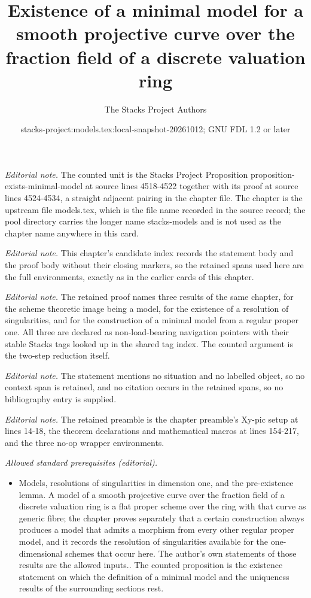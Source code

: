 \documentclass[10pt,a4paper]{amsart}
\title{Existence of a minimal model for a smooth projective curve over the fraction field of a discrete valuation ring}
\author{The Stacks Project Authors}
\date{stacks-project:models.tex:local-snapshot-20261012; GNU FDL 1.2 or later}
\theoremstyle{plain}
\theoremstyle{definition}
\theoremstyle{remark}
\numberwithin{equation}{subsection}
\begin{document}
\maketitle
\noindent\textit{Editorial note.} The counted unit is the Stacks Project Proposition proposition-exists-minimal-model at source lines 4518-4522 together with its proof at source lines 4524-4534, a straight adjacent pairing in the chapter file. The chapter is the upstream file models.tex, which is the file name recorded in the source record; the pool directory carries the longer name stacks-models and is not used as the chapter name anywhere in this card.\par\medskip
\noindent\textit{Editorial note.} This chapter's candidate index records the statement body and the proof body without their closing markers, so the retained spans used here are the full environments, exactly as in the earlier cards of this chapter.\par\medskip
\noindent\textit{Editorial note.} The retained proof names three results of the same chapter, for the scheme theoretic image being a model, for the existence of a resolution of singularities, and for the construction of a minimal model from a regular proper one. All three are declared as non-load-bearing navigation pointers with their stable Stacks tags looked up in the shared tag index. The counted argument is the two-step reduction itself.\par\medskip
\noindent\textit{Editorial note.} The statement mentions no situation and no labelled object, so no context span is retained, and no citation occurs in the retained spans, so no bibliography entry is supplied.\par\medskip
\noindent\textit{Editorial note.} The retained preamble is the chapter preamble's Xy-pic setup at lines 14-18, the theorem declarations and mathematical macros at lines 154-217, and the three no-op wrapper environments.\par\medskip
\noindent\textit{Allowed standard prerequisites (editorial).}\begin{itemize}
\item Models, resolutions of singularities in dimension one, and the pre-existence lemma. A model of a smooth projective curve over the fraction field of a discrete valuation ring is a flat proper scheme over the ring with that curve as generic fibre; the chapter proves separately that a certain construction always produces a model that admits a morphism from every other regular proper model, and it records the resolution of singularities available for the one-dimensional schemes that occur here. The author's own statements of those results are the allowed inputs.. The counted proposition is the existence statement on which the definition of a minimal model and the uniqueness results of the surrounding sections rest.
\end{itemize}\medskip
\end{document}
